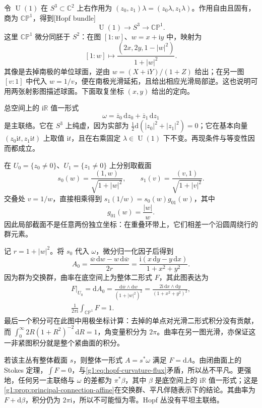 \begin{example}\label{g1:exm:hopf-principal-curvature}
	令 \(\operatorname{U}(1)\) 在 \(S^3\subset\mathbb C^2\) 上右作用为 \((z_0,z_1)\lambda=(z_0\lambda,z_1\lambda)\)。作用自由且固有，商为 \(\mathbb{CP}^1\)，得到[Hopf bundle]
	\[
		\operatorname{U}(1)\longrightarrow S^3\longrightarrow\mathbb{CP}^1.
	\]
	这里 \(\mathbb{CP}^1\) 微分同胚于 \(S^2\)：在图 \([1:w]\)、\(w=x+\mathrm{i}y\) 中，映射为
	\[
		[1:w]\longmapsto\frac{(2x,2y,1-|w|^2)}{1+|w|^2}.
	\]
	其像是去掉南极的单位球面，逆由 \(w=(X+\mathrm{i}Y)/(1+Z)\) 给出；在另一图 \([v:1]\) 中代入 \(w=1/v\)，便在南极光滑延拓，且给出相应光滑局部逆。这也说明可用两张射影图描述球面。下面取复坐标 \((x,y)\) 给出的定向。

	总空间上的 \(\mathrm{i}\mathbb R\) 值一形式
	\[
		\omega=\overline z_0\,\mathrm{d}z_0+\overline z_1\,\mathrm{d}z_1
	\]
	是主联络。它在 \(S^3\) 上纯虚，因为实部为 \(\tfrac12\mathrm{d}(|z_0|^2+|z_1|^2)=0\)；它在基本向量 \((z_0\mathrm{i}t,z_1\mathrm{i}t)\) 上取值 \(\mathrm{i}t\)，且在右乘固定 \(\lambda\in\operatorname{U}(1)\) 下不变。再现条件与等变性因而都成立。

	在 \(U_0=\{z_0\ne0\}\)、\(U_1=\{z_1\ne0\}\) 上分别取截面
	\[
		s_0(w)=\frac{(1,w)}{\sqrt{1+|w|^2}},\qquad
		s_1(v)=\frac{(v,1)}{\sqrt{1+|v|^2}}.
	\]
	交叠处 \(v=1/w\)，直接相乘得到 \(s_1(1/w)=s_0(w)g_{01}(w)\)，其中
	\begin{equation}\label{g1:eq:hopf-transition}
		g_{01}(w)=\frac{|w|}{w}.
	\end{equation}
	因此局部截面不是任意两份独立坐标：在重叠环带上，它们相差一个沿圆周绕行的群元素。

	记 \(r=1+|w|^2\)。将 \(s_0\) 代入 \(\omega\)，微分归一化因子后得到
	\[
		A_0=\frac{\overline w\,\mathrm{d}w-w\,\mathrm{d}\overline w}{2r}
		=\frac{\mathrm{i}(x\,\mathrm{d}y-y\,\mathrm{d}x)}{1+x^2+y^2}.
	\]
	因为群为交换群，曲率在底空间上为整体二形式 \(F\)，其此图表达为
	\begin{equation}\label{g1:eq:hopf-curvature-flux}
		\begin{gathered}
			F|_{U_0}=\mathrm{d}A_0
			=\frac{\mathrm{d}\overline w\wedge\mathrm{d}w}{(1+|w|^2)^2}
			=\frac{2\mathrm{i}\,\mathrm{d}x\wedge\mathrm{d}y}{(1+x^2+y^2)^2},\\
			\frac1{2\pi\mathrm{i}}\int_{\mathbb{CP}^1}F=1.
		\end{gathered}
	\end{equation}
	最后一个积分可在此图中用极坐标计算：去掉的单点对光滑二形式积分没有贡献，而 \(\int_0^\infty 2R(1+R^2)^{-2}\,\mathrm{d}R=1\)，角变量积分为 \(2\pi\)。曲率在另一图光滑，亦保证这一非紧图积分就是整个紧曲面的积分。

	若该主丛有整体截面 \(s\)，则整体一形式 \(A=s^*\omega\) 满足 \(F=\mathrm{d}A\)。由闭曲面上的 Stokes 定理，\(\int F=0\)，与\eqref{g1:eq:hopf-curvature-flux}矛盾，所以丛不平凡。更强地，任何另一主联络与 \(\omega\) 的差都为 \(\pi^*\beta\)，其中 \(\beta\) 是底空间上的 \(\mathrm{i}\mathbb R\) 值一形式；这是\cref{g1:prop:principal-connection-affine}在交换群、平凡伴随表示下的结论。其曲率为 \(F+\mathrm{d}\beta\)，积分仍为 \(2\pi\mathrm{i}\)，所以不可能恒为零。Hopf 丛没有平坦主联络。
\end{example}

